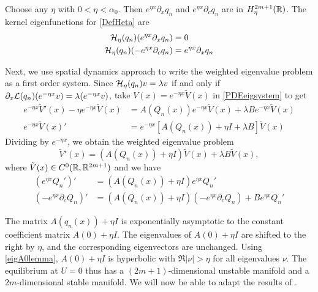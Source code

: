 \documentclass[thesis.tex]{subfiles}
\begin{document}
Choose any $\eta$ with $0 < \eta < \alpha_0$. Then $e^{\eta x} \partial_x q_n$ and $e^{\eta x} \partial_c q_n$ are in $H_\eta^{2m+1}(\mathbb{R})$. The kernel eigenfunctions for \cref{DefHeta} are 
\begin{equation}\label{weightedkernel1}
\begin{aligned}
\mathcal{H}_\eta(q_n) (e^{\eta x} \partial_x q_n) &= 0 \\
\mathcal{H}_\eta(q_n) (-e^{\eta x} \partial_c q_n) &= e^{\eta x} \partial_x q_n
\end{aligned}
\end{equation}

Next, we use spatial dynamics approach to write the weighted eigenvalue problem as a first order system. Since $\mathcal{H}_\eta(q_n) v = \lambda v$ if and only if $\partial_x \mathcal{L}(q_n) (e^{-\eta x} v) = \lambda (e^{-\eta x} v)$, take $V(x) = e^{-\eta x} \tilde{V}(x)$ in \cref{PDEeigsystem} to get
\begin{align*}
e^{-\eta x} \tilde{V}'(x) - \eta e^{-\eta x}\tilde{V}(x) &= A(Q_n(x))e^{-\eta x}\tilde{V}(x) + \lambda B e^{-\eta x}\tilde{V}(x) \\
e^{-\eta x} \tilde{V}(x)' &= e^{-\eta x} [A(Q_n(x)) + \eta I + \lambda B] \tilde{V}(x)
\end{align*}
Dividing by $e^{-\eta x}$, we obtain the weighted eigenvalue problem
\begin{equation}\label{weightedeig}
\tilde{V}'(x) = (A(Q_n(x)) + \eta I)\tilde{V}(x) + \lambda B \tilde{V}(x),
\end{equation}
where $\tilde{V}(x) \in C^0(\mathbb{R}, \mathbb{R}^{2m+1})$ and we have
\begin{equation}\label{weightedkernel2}
\begin{aligned}
(e^{\eta x} Q_n')' &= (A(Q_n(x)) + \eta I) e^{\eta x} Q_n' \\
(-e^{\eta x} \partial_c Q_n)' &= (A(Q_n(x)) + \eta I) (-e^{\eta x} \partial_c Q_n) + B e^{\eta x} Q_n'
\end{aligned}
\end{equation}

The matrix $A(q_n(x)) + \eta I$ is exponentially asymptotic to the constant coefficient matrix $A(0) + \eta I$. The eigenvalues of $A(0) + \eta I$ are shifted to the right by $\eta$, and the corresponding eigenvectors are unchanged. Using \cref{eigA0lemma}, $A(0) + \eta I$ is hyperbolic with $\Re|\nu| > \eta$ for all eigenvalues $\nu$. The equilibrium at $U = 0$ thus has a $(2m+1)$-dimensional unstable manifold and a $2m$-dimensional stable manifold. We will now be able to adapt the results of \cite{Sandstede1998}. 
\end{document}

